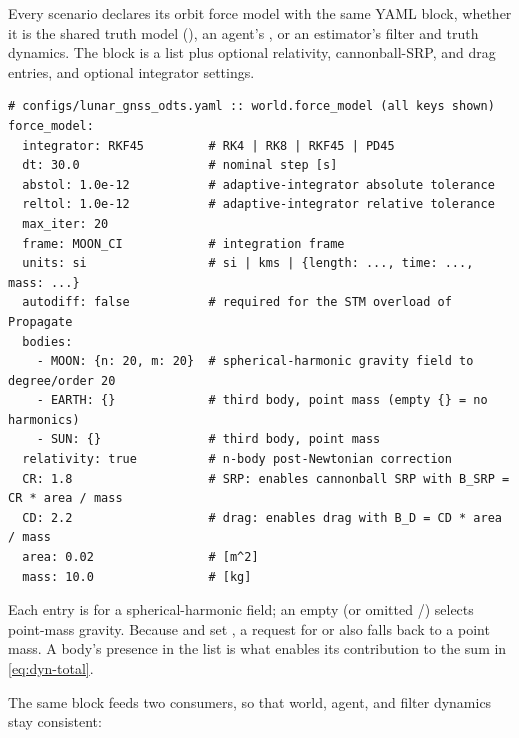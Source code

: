 Every scenario declares its orbit force model with the same YAML
 block, whether it is the shared truth model
(), an agent's , or an estimator's
filter and truth dynamics. The block is a  list plus optional
relativity, cannonball-SRP, and drag entries, and optional integrator settings.

\begin{lstlisting}[language=yamlcfg, caption={Unified force-model block.}, label={lst:dyn-yaml}]
# configs/lunar_gnss_odts.yaml :: world.force_model (all keys shown)
force_model:
  integrator: RKF45         # RK4 | RK8 | RKF45 | PD45
  dt: 30.0                  # nominal step [s]
  abstol: 1.0e-12           # adaptive-integrator absolute tolerance
  reltol: 1.0e-12           # adaptive-integrator relative tolerance
  max_iter: 20
  frame: MOON_CI            # integration frame
  units: si                 # si | kms | {length: ..., time: ..., mass: ...}
  autodiff: false           # required for the STM overload of Propagate
  bodies:
    - MOON: {n: 20, m: 20}  # spherical-harmonic gravity field to degree/order 20
    - EARTH: {}             # third body, point mass (empty {} = no harmonics)
    - SUN: {}               # third body, point mass
  relativity: true          # n-body post-Newtonian correction
  CR: 1.8                   # SRP: enables cannonball SRP with B_SRP = CR * area / mass
  CD: 2.2                   # drag: enables drag with B_D = CD * area / mass
  area: 0.02                # [m^2]
  mass: 10.0                # [kg]
\end{lstlisting}

Each  entry is  for a
spherical-harmonic field; an empty \code{\{\}} (or omitted /)
selects point-mass gravity. Because  and  set
, a request for
 or  also falls back to a point mass. A
body's presence in the list is what enables its contribution to the sum in
\cref{eq:dyn-total}.

The same block feeds two consumers, so that world, agent, and filter dynamics
stay consistent:

